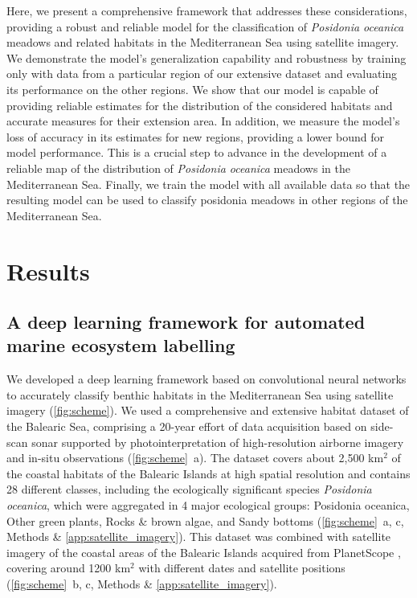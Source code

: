 Here, we present a comprehensive framework that addresses these considerations,
providing a robust and reliable model for the classification of
\textit{Posidonia
    oceanica} meadows and related habitats in the Mediterranean Sea using
satellite imagery. We demonstrate the model's generalization capability and
robustness by training only with data from a particular region of our extensive
dataset and evaluating its performance on the other regions. We show that our
model is capable of providing reliable estimates for the distribution of the
considered habitats and accurate measures for their extension area. In
addition, we measure the model's loss of accuracy in its estimates for new
regions, providing a lower bound for model performance. This is a
crucial step to advance in the development of a reliable map of the
distribution of \textit{Posidonia oceanica} meadows in the Mediterranean Sea.
Finally, we train the model with all available data so that the resulting
model can be used to classify posidonia meadows in other regions of the
Mediterranean Sea.

\section{Results}

\subsection{A deep learning framework for automated marine ecosystem
    labelling}

We developed a deep learning framework based on convolutional neural networks
to accurately classify benthic habitats in the Mediterranean Sea using
satellite imagery (\cref{fig:scheme}). We used a comprehensive and extensive
habitat dataset of the Balearic Sea, comprising a 20-year effort of data
acquisition based on side-scan sonar supported by photointerpretation of
high-resolution airborne imagery and in-situ observations
(\cref{fig:scheme}~\textcolor{ref_color}{a}).
The dataset covers  about 2,500 km$^2$ of the coastal habitats of the Balearic
Islands at high spatial resolution and contains 28 different classes,
including the ecologically significant species \textit{Posidonia
    oceanica}, which were aggregated in 4 major ecological groups: Posidonia
oceanica, Other green plants, Rocks \& brown algae, and Sandy bottoms
(\cref{fig:scheme}~\textcolor{ref_color}{a, c}, Methods \&
\cref{app:satellite_imagery}). This
dataset was combined with satellite imagery of the coastal areas of the
Balearic Islands acquired from PlanetScope \cite{planet2017}, covering around
1200 km$^2$ with different dates and satellite positions
(\cref{fig:scheme}~\textcolor{ref_color}{b, c},
Methods \& \cref{app:satellite_imagery}).

